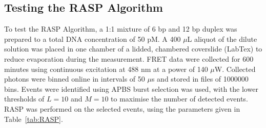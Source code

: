 \subsection*{Testing the RASP Algorithm}
To test the RASP Algorithm, a 1:1 mixture of 6 bp and 12 bp duplex was prepared to a total DNA concentration of 50 pM. A 400 $\mu$L aliquot of the dilute solution was placed in one chamber of a lidded, chambered coverslide (LabTex) to reduce evaporation during the measurement. FRET data were collected for 600 minutes using continuous excitation at 488 nm at a power of 140 $\mu$W. Collected photons were binned online in intervals of 50 $\mu$s and stored in files of 1000000 bins. Events were identified using APBS burst selection was used, with the lower thresholds of $L = 10$ and $M = 10$ to maximise the number of detected events. RASP was performed on the selected events, using the parameters given in Table~\ref{tab:RASP}. 



